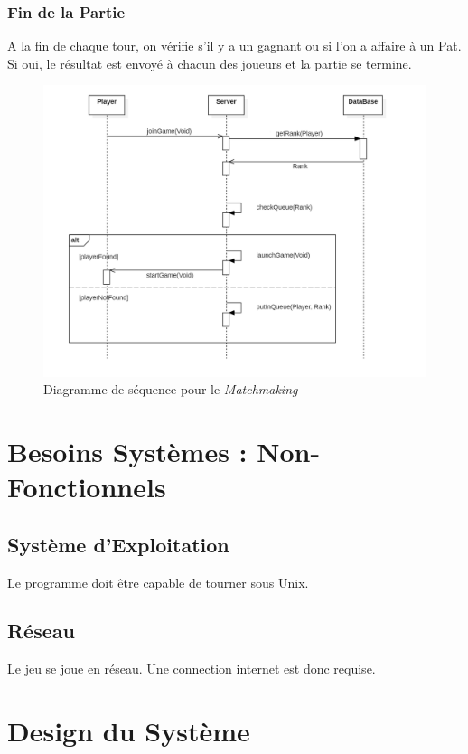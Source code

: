 \documentclass[10pt, a4paper]{article}
\begin{document}
\subsubsection{Fin de la Partie}
A la fin de chaque tour, on vérifie s'il y a un gagnant ou si l'on a affaire à un Pat. Si oui, le résultat est envoyé à chacun des joueurs et la partie se termine.

		
\begin{figure}[ht]
\centering
\includegraphics[scale=0.4]{SequenceDiagramMatchmaking.PNG}
\caption{Diagramme de séquence pour le \textit{Matchmaking}}
\label{SD_matchmaker} %
\end{figure}

\section{Besoins Systèmes : Non-Fonctionnels}


\subsection{Système d'Exploitation}
Le programme doit être capable de tourner sous Unix. \\

\subsection{Réseau}
Le jeu se joue en réseau. Une connection internet est donc requise. \\

\section{Design du Système}
\end{document}
